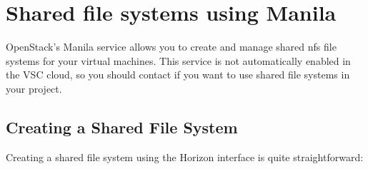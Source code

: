 \chapter{Shared file systems using Manila}\label{cha:shared-file-systems}

OpenStack's Manila service allows you to create and manage shared \gls{nfs} file systems for your virtual machines.  This service is not automatically enabled in the VSC cloud, so you should contact \cloudinfo if you want to use shared file systems in your project.

\section*{Creating a Shared File System}\label{sec:creating-shared-file}
Creating a shared file system using the Horizon interface is quite straightforward:
